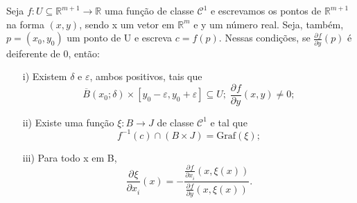 \documentclass[../analysisII_notes.tex]{subfiles}
\begin{document}
\hypertarget{implicit_function}{
	\begin{theorem*}
		Seja \(f:U\subseteq \mathbb{R}^{m+1}\rightarrow \mathbb{R}\) uma função de classe \(\mathcal{C}^{1}\) e escrevamos os pontos de \(\mathbb{R}^{m+1}\) na forma \((x, y)\), sendo x um vetor em \(\mathbb{R}^{m}\) e y um número real. Seja, também, \(p=(x_{0}, y_{0})\) um ponto de U e escreva \(c=f(p).\) Nessas condições, se \(\frac{\partial^{}f}{\partial y^{}}(p)\) é deiferente de 0, então:
		\begin{itemize}
			\item[i)] Existem \(\delta \) e \(\varepsilon \), ambos positivos, tais que
			      \[
				      \overline{B}(x_{0}; \delta ) \times [y_{0}-\varepsilon , y_{0}+\varepsilon ] \subseteq U;\; \frac{\partial^{}f}{\partial y^{}}(x, y)\neq 0;
			      \]
			\item[ii)] Existe uma função \(\xi :B\rightarrow J\) de classe \(\mathcal{C}^{1}\) e tal que
			      \[
				      f^{-1}(c)\cap (B\times J) = \mathrm{Graf}(\xi );
			      \]
			\item[iii)] Para todo x em B,
			      \[
				      \frac{\partial^{}\xi }{\partial x_{i}^{}}(x) = -\frac{\frac{\partial^{}f}{\partial x_{i}^{}}(x, \xi (x))}{\frac{\partial^{}f}{\partial y^{}}(x, \xi (x))}.
			      \]
		\end{itemize}
	\end{theorem*}
}
\end{document}
